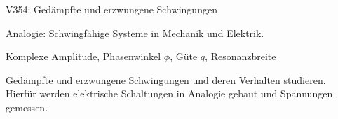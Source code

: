 


    


    \begin{Versuch}{V354: Gedämpfte und erzwungene Schwingungen}
	\begin{Stichworte}
		Analogie: Schwingfähige Systeme in Mechanik und Elektrik.

		Komplexe Amplitude,
		Phasenwinkel $\phi$,
		Güte $q$,
		Resonanzbreite

	\end{Stichworte}

	\begin{Zielsetzung}
		Gedämpfte und erzwungene Schwingungen und deren Verhalten studieren. Hierfür werden elektrische Schaltungen in Analogie gebaut und Spannungen gemessen.
	\end{Zielsetzung}

    \begin{Theorie}

\end{Theorie}
\end{Versuch}
